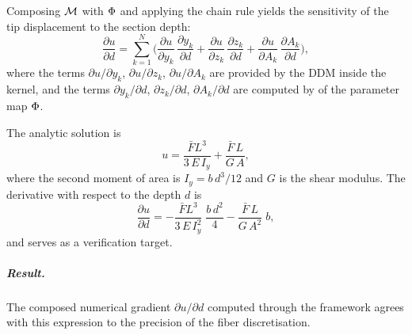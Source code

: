 Composing $\mathcal{M}$ with $\Phi$ and applying the chain rule yields the
sensitivity of the tip displacement to the section depth:
\begin{equation*}
    \frac{\partial u}{\partial d}
    = \sum_{k=1}^{N}
      \biggl(
        \frac{\partial u}{\partial y_k}\,\frac{\partial y_k}{\partial d}
      + \frac{\partial u}{\partial z_k}\,\frac{\partial z_k}{\partial d}
      + \frac{\partial u}{\partial A_k}\,\frac{\partial A_k}{\partial d}
      \biggr),
\end{equation*}
where the terms $\partial u/\partial y_k$,
$\partial u/\partial z_k$, $\partial u/\partial A_k$ are provided by
the DDM inside the kernel, and the terms
$\partial y_k/\partial d$, $\partial z_k/\partial d$,
$\partial A_k/\partial d$ are computed by \autodiff{} of the parameter map $\Phi$.

The analytic solution is
\begin{equation*}
    u = \frac{\bar{F} L^{3}}{3\,E\,I_y} + \frac{\bar{F}\,L}{G\,A},
\end{equation*}
where the second moment of area is $I_y = b\,d^{3}/12$  and
$G$ is the shear modulus.  
The derivative with respect to the depth $d$ is
\begin{equation*}
    \frac{\partial u}{\partial d}
    = -\frac{\bar{F} L^{3}}{3\,E\,I_y^{2}}\;\frac{b\,d^{2}}{4}
      -\frac{\bar{F}\,L}{G\,A^{2}}\;b,
\end{equation*}
and serves as a verification target.

\subparagraph{Result.}
The composed numerical gradient
$\partial u/\partial d$ computed through the framework agrees with
this expression to the precision of the fiber discretisation.

